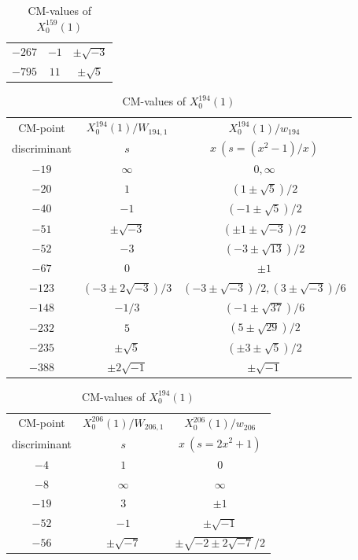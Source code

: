 \documentclass{amsart}
\theoremstyle{definition}
\begin{document}
\begin{appendices}
\begin{table}
\begin{tabular}{|c|c|c|}
${-267}$ & $-1$ & $\pm\sqrt{-3}$     \\ 
${-795}$ & $11$ & $\pm\sqrt{5}$   \\ \hline





\end{tabular}%
\bigskip
\caption{CM-values of $X^{159}_0(1)$}
\end{table}

\renewcommand{\arraystretch}{1.5}
\tabcolsep=10pt                         
\begin{table}[htb]
\newcommand{\tabincell}[2]{\begin{tabular}{@{}#1@{}}#2\end{tabular}}
  \centering
\begin{tabular}{|c|c|c|}
\hline
CM-point& ${X_{0}^{194}(1)/W_{194,1}}$ & ${X_{0}^{194}(1)/w_{194}}$  \\ 
discriminant & $s$ & $x\ (s=(x^2-1)/{x})$  \\ \hline
${-19}$ & $\infty $ & $0,\infty $  \\ 

${-20}$ & $1$ & $(1\pm\sqrt{5})/{2}$ \\ 
${-40}$ & $-1$ & $(-1\pm\sqrt{5})/{2}$  \\
${-51}$ & $\pm \sqrt{-3}$ & $(\pm 1\pm\sqrt{-3})/{2}$ 
\\ 
${-52}$ & $-3$ & $(-3\pm\sqrt{13})/{2}$ \\
${-67}$ & $0$ & $\pm 1$  \\ 
${-123}$ & $(-3\pm 2\sqrt{-3})/{3}$ & $(-3\pm\sqrt{-3})/{2},(3\pm\sqrt{-3})/{6}$ 
\\ 
${-148}$ & $-{1}/{3}$ & $(-1\pm\sqrt{37})/{6}$ 
\\ 




${-232}$ & $5$ & $(5\pm \sqrt{29})/{2}$  \\ 
${-235}$ & $\pm \sqrt{5}$ & $(\pm 3\pm\sqrt{5})/{2}$ 
\\ 


${-388}$ & $\pm 2\sqrt{-1}$ & $\pm \sqrt{-1}$  \\ \hline
\end{tabular}
\bigskip
\caption{CM-values of $X^{194}_0(1)$}






\renewcommand{\arraystretch}{1.5}
\tabcolsep=10pt                         
  \centering
\begin{tabular}{|c|c|c|}
\hline
CM-point& ${X_{0}^{206}(1)/W_{206,1}}$ & ${X_{0}^{206}(1)/w_{206}}$  \\ 
discriminant & $s$ & $x\ (s=2x^2+1)$  \\ \hline
${-4}$ & $1$ & $0$ \\ 
${-8}$ & $\infty$ & $\infty$  \\ 
${-19}$ & $3$ & $\pm 1$   \\ 
${-52}$ & $-1$ & $\pm \sqrt{-1}$  \\ 
${-56}$ & $\pm\sqrt{-7}$ & $\pm \sqrt{-2\pm 2\sqrt{-7}}/{2}$   \\ 


\end{tabular}
\end{table}
\end{appendices}
\end{document}
